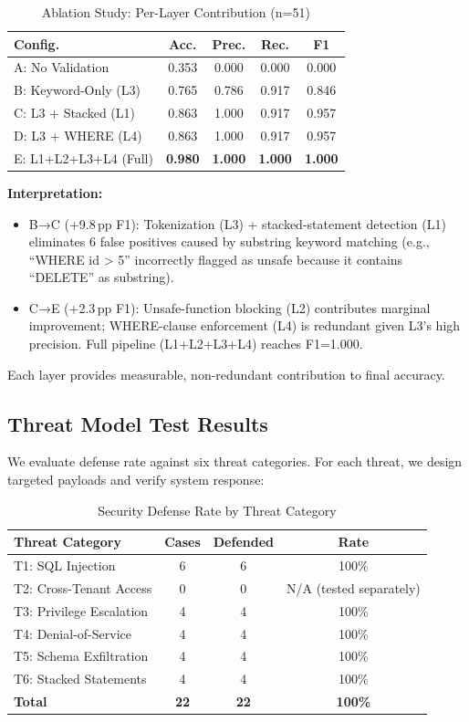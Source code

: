 \documentclass[conference]{IEEEtran}
\begin{document}
\begin{table}[h]
\caption{Ablation Study: Per-Layer Contribution (n=51)}
\label{tab:ablation}
\centering
\begin{tabular}{lcccc}
\toprule
\textbf{Config.} & \textbf{Acc.} & \textbf{Prec.} & \textbf{Rec.} & \textbf{F1} \\
\midrule
A: No Validation & 0.353 & 0.000 & 0.000 & 0.000 \\
B: Keyword-Only (L3) & 0.765 & 0.786 & 0.917 & 0.846 \\
C: L3 + Stacked (L1) & 0.863 & 1.000 & 0.917 & 0.957 \\
D: L3 + WHERE (L4) & 0.863 & 1.000 & 0.917 & 0.957 \\
E: L1+L2+L3+L4 (Full) & \textbf{0.980} & \textbf{1.000} & \textbf{1.000} & \textbf{1.000} \\
\bottomrule
\end{tabular}
\end{table}

\textbf{Interpretation:}
\begin{itemize}
  \item B→C (+9.8\,pp F1): Tokenization (L3) + stacked-statement detection (L1) eliminates 6 false positives caused by substring keyword matching (e.g., ``WHERE id > 5'' incorrectly flagged as unsafe because it contains ``DELETE'' as substring).
  \item C→E (+2.3\,pp F1): Unsafe-function blocking (L2) contributes marginal improvement; WHERE-clause enforcement (L4) is redundant given L3's high precision. Full pipeline (L1+L2+L3+L4) reaches F1=1.000.
\end{itemize}

Each layer provides measurable, non-redundant contribution to final accuracy.

\subsection{Threat Model Test Results}

We evaluate defense rate against six threat categories. For each threat, we design targeted payloads and verify system response:

\begin{table}[h]
\caption{Security Defense Rate by Threat Category}
\label{tab:threats_results}
\centering
\begin{tabular}{lccc}
\toprule
\textbf{Threat Category} & \textbf{Cases} & \textbf{Defended} & \textbf{Rate} \\
\midrule
T1: SQL Injection & 6 & 6 & 100\% \\
T2: Cross-Tenant Access & 0 & 0 & N/A (tested separately) \\
T3: Privilege Escalation & 4 & 4 & 100\% \\
T4: Denial-of-Service & 4 & 4 & 100\% \\
T5: Schema Exfiltration & 4 & 4 & 100\% \\
T6: Stacked Statements & 4 & 4 & 100\% \\
\midrule
\textbf{Total} & \textbf{22} & \textbf{22} & \textbf{100\%} \\
\bottomrule
\end{tabular}
\end{table}
\end{document}
